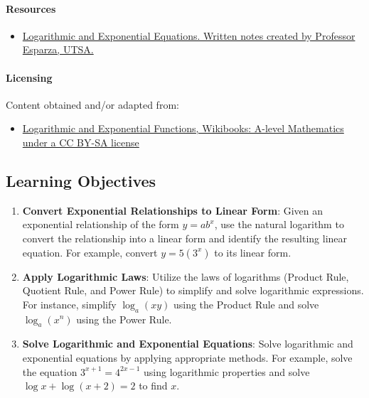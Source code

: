 
\paragraph{Resources}

\begin{itemize}
    \item \href{https://mathresearch.utsa.edu/wikiFiles/MAT1093/Logarithmic\%20and\%20Exponential\%20Equations/Esparza\%201093\%20Notes\%207.4.pdf}{Logarithmic and Exponential Equations. Written notes created by Professor Esparza, UTSA.}
\end{itemize}

\paragraph{Licensing}

Content obtained and/or adapted from:

\begin{itemize}
    \item \href{https://en.wikibooks.org/wiki/A-level_Mathematics/CIE/Pure_Mathematics_2/Logarithmic_and_Exponential_Functions}{Logarithmic and Exponential Functions, Wikibooks: A-level Mathematics under a CC BY-SA license}
\end{itemize}

\subsection{Learning Objectives}

\begin{enumerate}
    \item \textbf{Convert Exponential Relationships to Linear Form}: Given an exponential relationship of the form $y = ab^x$, use the natural logarithm to convert the relationship into a linear form and identify the resulting linear equation. For example, convert $y = 5 (3^x)$ to its linear form.
    \item \textbf{Apply Logarithmic Laws}: Utilize the laws of logarithms (Product Rule, Quotient Rule, and Power Rule) to simplify and solve logarithmic expressions. For instance, simplify $\log_a (xy)$ using the Product Rule and solve $\log_a (x^n)$ using the Power Rule.
    \item \textbf{Solve Logarithmic and Exponential Equations}: Solve logarithmic and exponential equations by applying appropriate methods. For example, solve the equation $3^{x+1} = 4^{2x-1}$ using logarithmic properties and solve $\log x + \log(x+2) = 2$ to find $x$.
\end{enumerate}

